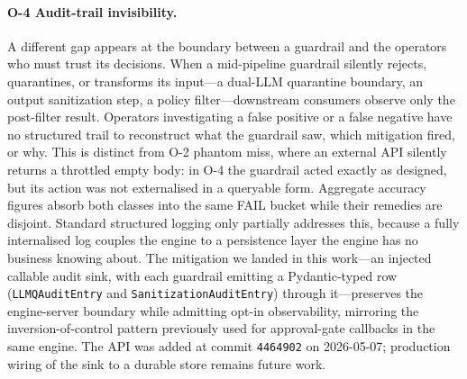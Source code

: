 \paragraph{O-4 Audit-trail invisibility.}
A different gap appears at the boundary between a guardrail and the
operators who must trust its decisions.  When a mid-pipeline
guardrail silently rejects, quarantines, or transforms its
input---a dual-LLM quarantine boundary, an output sanitization
step, a policy filter---downstream consumers observe only the
post-filter result.  Operators investigating a false positive or a
false negative have no structured trail to reconstruct what the
guardrail saw, which mitigation fired, or why.  This is distinct
from O-2 phantom miss, where an external API silently returns a
throttled empty body: in O-4 the guardrail acted exactly as
designed, but its action was not externalised in a queryable form.
Aggregate accuracy figures absorb both classes into the same FAIL
bucket while their remedies are disjoint.  Standard structured
logging only partially addresses this, because a fully internalised
log couples the engine to a persistence layer the engine has no
business knowing about.  The mitigation we landed in this work---an
injected callable audit sink, with each guardrail emitting a
Pydantic-typed row (\texttt{LLMQAuditEntry} and
\texttt{SanitizationAuditEntry}) through it---preserves the
engine-server boundary while admitting opt-in observability,
mirroring the inversion-of-control pattern previously used for
approval-gate callbacks in the same engine.  The API was added at
commit \texttt{4464902} on 2026-05-07; production wiring of the
sink to a durable store remains future work.

